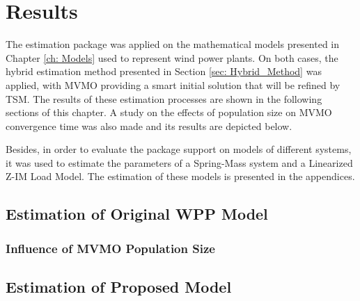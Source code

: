 \chapter{Results}
\label{ch: Results}

The estimation package was applied on the mathematical models presented in Chapter \ref{ch: Models} used to represent wind power plants. On both cases, the hybrid estimation method presented in Section \ref{sec: Hybrid_Method} was applied, with MVMO providing a smart initial solution that will be refined by TSM. The results of these estimation processes are shown in the following sections of this chapter. A study on the effects of population size on MVMO convergence time was also made and its results are depicted below.

Besides, in order to evaluate the package support on models of different systems, it was used to estimate the parameters of a Spring-Mass system and a Linearized Z-IM Load Model. The estimation of these models is presented in the appendices.

\section{Estimation of Original WPP Model}



\subsection{Influence of MVMO Population Size}



\section{Estimation of Proposed Model}
